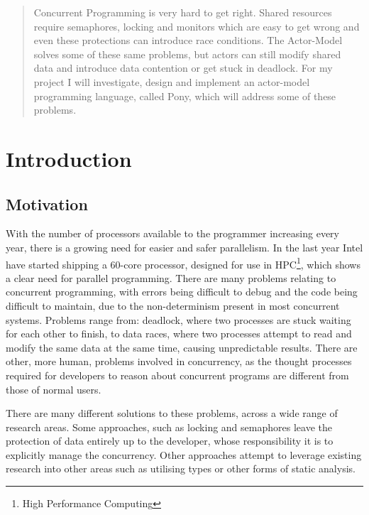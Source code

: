 \documentclass[pdftex,11pt,a4paper]{report}
\begin{document}
\setcounter{tocdepth}{2}
\tableofcontents

\newpage
\begin{abstract}

Concurrent Programming is very hard to get right.
Shared resources require semaphores, locking and monitors which are easy to get wrong and even these protections can introduce race conditions.
The Actor-Model solves some of these same problems, but actors can still modify shared data and introduce data contention or get stuck in deadlock.
For my project I will investigate, design and implement an actor-model programming language, called Pony, which will address some of these problems.
\end{abstract}

\chapter{Introduction}
\section{Motivation}

With the number of processors available to the programmer increasing every year\cite{freelunch}, there is a growing need for easier and safer parallelism.
In the last year Intel have started shipping a 60-core processor, designed for use in HPC\footnote{High Performance Computing}\cite{intel-phi}, which shows a clear need for parallel programming.
There are many problems relating to concurrent programming, with errors being difficult to debug and the code being difficult to maintain, due to the non-determinism present in most concurrent systems.
Problems range from: deadlock, where two processes are stuck waiting for each other to finish, to data races, where two processes attempt to read and modify the same data at the same time, causing unpredictable results.
There are other, more human, problems involved in concurrency, as the thought processes required for developers to reason about concurrent programs are different from those of normal users.

There are many different solutions to these problems, across a wide range of research areas.
Some approaches, such as locking and semaphores\cite{dijkstra-semaphore} leave the protection of data entirely up to the developer, whose responsibility it is to explicitly manage the concurrency.
Other approaches attempt to leverage existing research into other areas such as utilising types or other forms of static analysis.
\end{document}
